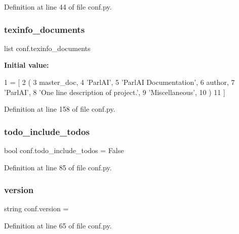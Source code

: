 Definition at line 44 of file conf.\+py.

\mbox{\label{namespaceconf_a54b0faed214ac92017d5689efbb10672}} 
\subsubsection{\texorpdfstring{texinfo\+\_\+documents}{texinfo\_documents}}
{\footnotesize\ttfamily list conf.\+texinfo\+\_\+documents}

{\bfseries Initial value\+:}
\begin{DoxyCode}
1 =  [
2     (
3         master\_doc,
4         \textcolor{stringliteral}{'ParlAI'},
5         \textcolor{stringliteral}{'ParlAI Documentation'},
6         author,
7         \textcolor{stringliteral}{'ParlAI'},
8         \textcolor{stringliteral}{'One line description of project.'},
9         \textcolor{stringliteral}{'Miscellaneous'},
10     )
11 ]
\end{DoxyCode}


Definition at line 158 of file conf.\+py.

\mbox{\label{namespaceconf_a8fe7f0d85f975f4ecba5cb6066959a09}} 
\subsubsection{\texorpdfstring{todo\+\_\+include\+\_\+todos}{todo\_include\_todos}}
{\footnotesize\ttfamily bool conf.\+todo\+\_\+include\+\_\+todos = False}



Definition at line 85 of file conf.\+py.

\mbox{\label{namespaceconf_ade15c5b54093b64d7c428ec19ca5b1cb}} 
\subsubsection{\texorpdfstring{version}{version}}
{\footnotesize\ttfamily string conf.\+version = \textquotesingle{}\textquotesingle{}}



Definition at line 65 of file conf.\+py.

